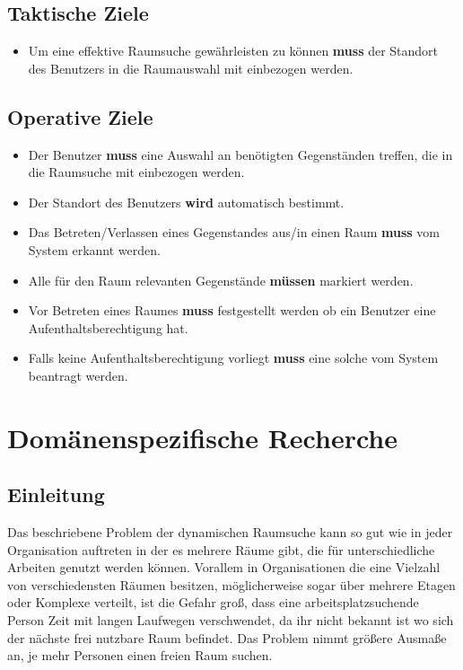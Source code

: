 \subsection{Taktische Ziele}
\label{sec:Taktische Ziele}

\begin{itemize}
	\item Um eine effektive Raumsuche gewährleisten zu können \textbf{muss} der
	Standort des Benutzers in die Raumauswahl mit einbezogen werden.
\end{itemize}

\subsection{Operative Ziele}
\label{sec:Operative Ziele}

\begin{itemize}
	\item Der Benutzer \textbf{muss} eine Auswahl an benötigten Gegenständen
	treffen, die in die Raumsuche mit einbezogen werden.
	\item Der Standort des Benutzers \textbf{wird} automatisch bestimmt.
	\item Das Betreten/Verlassen eines Gegenstandes aus/in einen Raum \textbf{muss}
	vom System erkannt werden.
	\item Alle für den Raum relevanten Gegenstände \textbf{müssen} markiert werden.
	\item Vor Betreten eines Raumes \textbf{muss} festgestellt werden ob ein
	Benutzer eine Aufenthaltsberechtigung hat.
	\item Falls keine Aufenthaltsberechtigung vorliegt \textbf{muss} eine solche
	\ggfs vom System beantragt werden.
\end{itemize}


\section{Domänenspezifische Recherche}
\label{sec:Domänenspezifische Recherche}

\subsection{Einleitung}
\label{sec:Domänen_Einleitung}

Das beschriebene Problem der dynamischen Raumsuche kann so gut wie in jeder
Organisation auftreten in der es mehrere Räume gibt, die für unterschiedliche
Arbeiten genutzt werden können. Vorallem in Organisationen die eine Vielzahl
von verschiedensten Räumen besitzen, möglicherweise sogar über mehrere Etagen
oder Komplexe verteilt, ist die Gefahr groß, dass eine arbeitsplatzsuchende
Person Zeit mit langen Laufwegen verschwendet, da ihr nicht bekannt ist wo sich
der nächste frei nutzbare Raum befindet. Das Problem nimmt größere Ausmaße an,
je mehr Personen einen freien Raum suchen.

